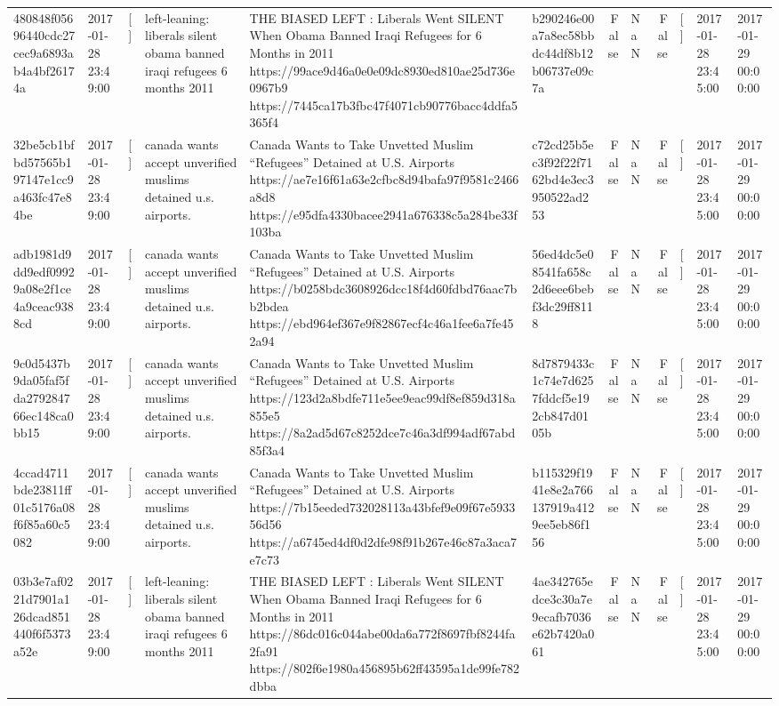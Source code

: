 \begin{tabular}{llllllrlrlll}
480848f05696440cdc27cec9a6893ab4a4bf26174a & 2017-01-28 23:49:00 & [] & left-leaning: liberals silent obama banned iraqi refugees 6 months 2011 & THE BIASED LEFT : Liberals Went SILENT When Obama Banned Iraqi Refugees for 6 Months in 2011 https://99ace9d46a0e0e09dc8930ed810ae25d736e0967b9 https://7445ca17b3fbc47f4071cb90776bacc4ddfa5365f4 & b290246e00a7a8ec58bbdc44df8b12b06737e09c7a & False & NaN & False & [] & 2017-01-28 23:45:00 & 2017-01-29 00:00:00 \\
32be5cb1bfbd57565b197147e1cc9a463fc47e84be & 2017-01-28 23:49:00 & [] & canada wants accept unverified muslims detained u.s. airports. & Canada Wants to Take Unvetted Muslim “Refugees” Detained at U.S. Airports https://ae7e16f61a63e2cfbc8d94bafa97f9581c2466a8d8 https://e95dfa4330bacee2941a676338c5a284be33f103ba & c72cd25b5ec3f92f22f7162bd4e3ec3950522ad253 & False & NaN & False & [] & 2017-01-28 23:45:00 & 2017-01-29 00:00:00 \\
adb1981d9dd9edf09929a08e2f1ce4a9ceac9388cd & 2017-01-28 23:49:00 & [] & canada wants accept unverified muslims detained u.s. airports. & Canada Wants to Take Unvetted Muslim “Refugees” Detained at U.S. Airports https://b0258bdc3608926dcc18f4d60fdbd76aac7bb2bdea https://ebd964ef367e9f82867ecf4c46a1fee6a7fe452a94 & 56ed4dc5e08541fa658c2d6eee6bebf3dc29ff8118 & False & NaN & False & [] & 2017-01-28 23:45:00 & 2017-01-29 00:00:00 \\
9c0d5437b9da05faf5fda279284766ec148ca0bb15 & 2017-01-28 23:49:00 & [] & canada wants accept unverified muslims detained u.s. airports. & Canada Wants to Take Unvetted Muslim “Refugees” Detained at U.S. Airports https://123d2a8bdfe711e5ee9eac99df8ef859d318a855e5 https://8a2ad5d67c8252dce7c46a3df994adf67abd85f3a4 & 8d7879433c1c74e7d6257fddcf5e192cb847d0105b & False & NaN & False & [] & 2017-01-28 23:45:00 & 2017-01-29 00:00:00 \\
4ccad4711bde23811ff01c5176a08f6f85a60c5082 & 2017-01-28 23:49:00 & [] & canada wants accept unverified muslims detained u.s. airports. & Canada Wants to Take Unvetted Muslim “Refugees” Detained at U.S. Airports https://7b15eeded732028113a43bfef9e09f67e593356d56 https://a6745ed4df0d2dfe98f91b267e46c87a3aca7e7c73 & b115329f1941e8e2a766137919a4129ee5eb86f156 & False & NaN & False & [] & 2017-01-28 23:45:00 & 2017-01-29 00:00:00 \\
03b3e7af0221d7901a126dcad851440f6f5373a52e & 2017-01-28 23:49:00 & [] & left-leaning: liberals silent obama banned iraqi refugees 6 months 2011 & THE BIASED LEFT : Liberals Went SILENT When Obama Banned Iraqi Refugees for 6 Months in 2011 https://86dc016c044abe00da6a772f8697fbf8244fa2fa91 https://802f6e1980a456895b62ff43595a1de99fe782dbba & 4ae342765edce3c30a7e9ecafb7036e62b7420a061 & False & NaN & False & [] & 2017-01-28 23:45:00 & 2017-01-29 00:00:00 \\

\end{tabular}

